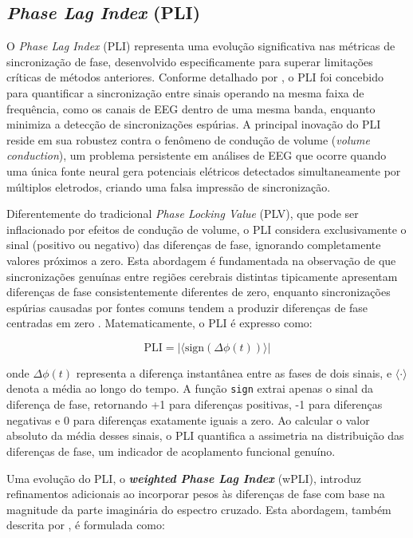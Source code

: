\subsection{\textit{Phase Lag Index} (PLI)}
O \textit{Phase Lag Index} (PLI) representa uma evolução significativa nas métricas de sincronização de fase, desenvolvido especificamente para superar limitações críticas de métodos anteriores. Conforme detalhado por , o PLI foi concebido para quantificar a sincronização entre sinais operando na mesma faixa de frequência, como os canais de EEG dentro de uma mesma banda, enquanto minimiza a detecção de sincronizações espúrias. A principal inovação do PLI reside em sua robustez contra o fenômeno de condução de volume (\textit{volume conduction}), um problema persistente em análises de EEG que ocorre quando uma única fonte neural gera potenciais elétricos detectados simultaneamente por múltiplos eletrodos, criando uma falsa impressão de sincronização.

Diferentemente do tradicional \textit{Phase Locking Value} (PLV), que pode ser inflacionado por efeitos de condução de volume, o PLI considera exclusivamente o sinal (positivo ou negativo) das diferenças de fase, ignorando completamente valores próximos a zero. Esta abordagem é fundamentada na observação de que sincronizações genuínas entre regiões cerebrais distintas tipicamente apresentam diferenças de fase consistentemente diferentes de zero, enquanto sincronizações espúrias causadas por fontes comuns tendem a produzir diferenças de fase centradas em zero \cite{seraj2018cerebral}. Matematicamente, o PLI é expresso como:

\[
\text{PLI} = |\langle \text{sign}(\Delta\phi(t)) \rangle|
\]

onde \(\Delta\phi(t)\) representa a diferença instantânea entre as fases de dois sinais, e \(\langle \cdot \rangle\) denota a média ao longo do tempo. A função \texttt{sign} extrai apenas o sinal da diferença de fase, retornando +1 para diferenças positivas, -1 para diferenças negativas e 0 para diferenças exatamente iguais a zero. Ao calcular o valor absoluto da média desses sinais, o PLI quantifica a assimetria na distribuição das diferenças de fase, um indicador de acoplamento funcional genuíno.

Uma evolução do PLI, o \textit{\textbf{weighted Phase Lag Index}} (wPLI), introduz refinamentos adicionais ao incorporar pesos às diferenças de fase com base na magnitude da parte imaginária do espectro cruzado. Esta abordagem, também descrita por , é formulada como:

